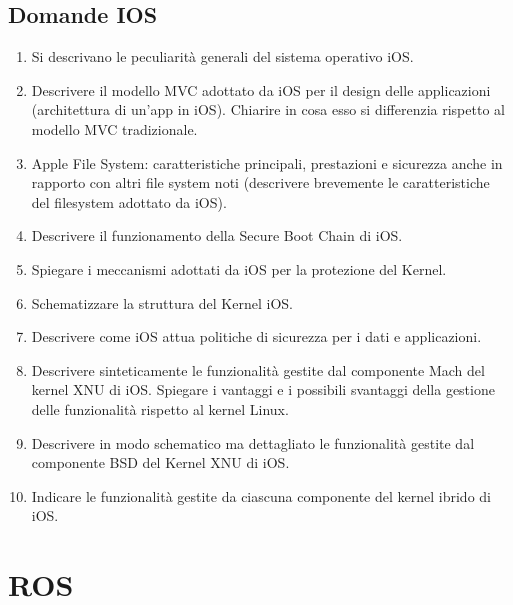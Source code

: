 \documentclass{report}
\begin{document}
\newpage
\section{Domande IOS}
\begin{enumerate}
    \item Si descrivano le peculiarità generali del sistema operativo iOS.
    \item Descrivere il modello MVC adottato da iOS per il design delle applicazioni (architettura di un'app in iOS). Chiarire in cosa esso si differenzia rispetto al modello MVC tradizionale.
    \item Apple File System: caratteristiche principali, prestazioni e sicurezza anche in rapporto con altri file system noti (descrivere brevemente le caratteristiche del filesystem adottato da iOS).
    \item Descrivere il funzionamento della Secure Boot Chain di iOS.
    \item Spiegare i meccanismi adottati da iOS per la protezione del Kernel.
    \item Schematizzare la struttura del Kernel iOS.
    \item Descrivere come iOS attua politiche di sicurezza per i dati e applicazioni.
    \item Descrivere sinteticamente le funzionalità gestite dal componente Mach del kernel XNU di iOS. Spiegare i vantaggi e i possibili svantaggi della gestione delle funzionalità rispetto al kernel Linux.
    \item Descrivere in modo schematico ma dettagliato le funzionalità gestite dal componente BSD del Kernel XNU di iOS.
    \item Indicare le funzionalità gestite da ciascuna componente del kernel ibrido di iOS.
\end{enumerate}


\chapter{ROS}
\end{document}
